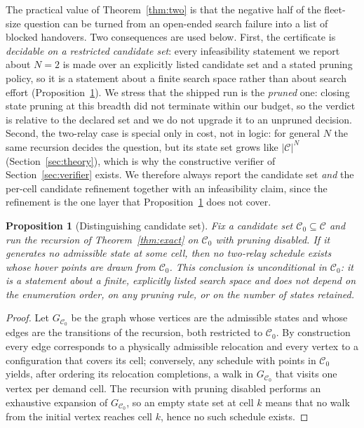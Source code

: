 \documentclass[11pt]{article}
\theoremstyle{dshplain}
\newtheorem{proposition}[theorem]{Proposition}
\theoremstyle{dshdefn}
\begin{document}
\noindent The practical value of Theorem~\ref{thm:two} is that the negative half of
the fleet-size question can be turned from an open-ended search failure into a list
of blocked handovers. Two consequences are used below. First, the certificate is
\emph{decidable on a restricted candidate set}: every infeasibility statement we
report about $N=2$ is made over an explicitly listed candidate set and a stated
pruning policy, so it is a statement about a finite search space rather than about
search effort (Proposition~\ref{prop:distinguishing}). We stress that the shipped
run is the \emph{pruned} one: closing state pruning at this breadth did not
terminate within our budget, so the verdict is relative to the declared set and we
do not upgrade it to an unpruned decision. Second, the two-relay case
is special only in cost, not in logic: for general $N$ the same recursion decides
the question, but its state set grows like $|\mathcal{C}|^{N}$
(Section~\ref{sec:theory}), which is why the constructive verifier of
Section~\ref{sec:verifier} exists. We therefore always report the candidate set
\emph{and} the per-cell candidate refinement together with an infeasibility
claim, since the refinement is the one layer that Proposition~\ref{prop:distinguishing}
does not cover.

\begin{proposition}[Distinguishing candidate set]
\label{prop:distinguishing}
Fix a candidate set $\mathcal{C}_0\subseteq\mathcal{C}$ and run the recursion of
Theorem~\ref{thm:exact} on $\mathcal{C}_0$ with pruning disabled. If it generates
no admissible state at some cell, then no two-relay schedule exists whose hover
points are drawn from $\mathcal{C}_0$. This conclusion is unconditional in
$\mathcal{C}_0$: it is a statement about a finite, explicitly listed search space
and does not depend on the enumeration order, on any pruning rule, or on the
number of states retained.
\end{proposition}
\begin{proof}
Let $G_{\mathcal{C}_0}$ be the graph whose vertices are the admissible states and
whose edges are the transitions of the recursion, both restricted to
$\mathcal{C}_0$. By construction every edge corresponds to a physically
admissible relocation and every vertex to a configuration that covers its cell;
conversely, any schedule with points in $\mathcal{C}_0$ yields, after ordering its
relocation completions, a walk in $G_{\mathcal{C}_0}$ that visits one vertex per
demand cell. The recursion with pruning disabled performs an exhaustive
expansion of $G_{\mathcal{C}_0}$, so an empty state set at cell $k$ means that no
walk from the initial vertex reaches cell $k$, hence no such schedule exists.
\end{proof}
\end{document}

